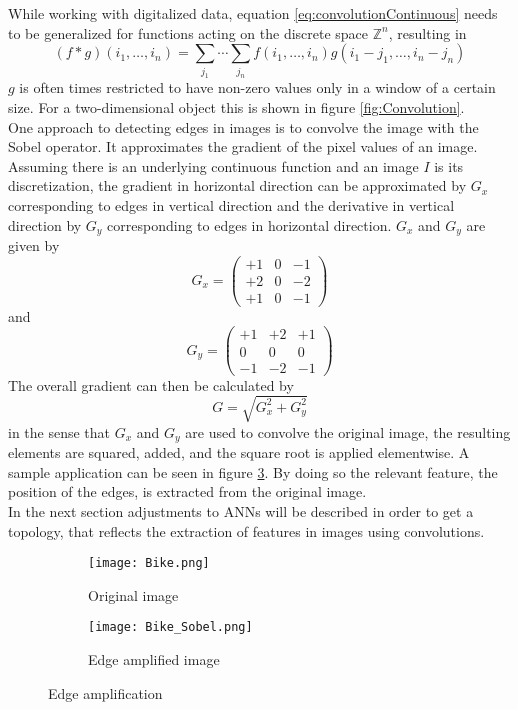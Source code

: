 While working with digitalized data, equation \ref{eq:convolutionContinuous} needs to be generalized for functions acting on the discrete space $\mathbb{Z}^n$, resulting in
\begin{equation}\label{eq:convolutionDiscrete}
(f*g)(i_1,\dots ,i_n) = \sum_{j_1} \cdots \sum_{j_n} f(i_1,\dots ,i_n) g(i_1-j_1,\dots ,i_n-j_n)
\end{equation}
$g$ is often times restricted to have non-zero values only in a window of a certain size. For a two-dimensional object this is shown in figure \ref{fig:Convolution}. \\
One approach to detecting edges in images is to convolve the image with the Sobel operator. It approximates the gradient of the pixel values of an image. Assuming there is an underlying continuous function and an image $I$ is its discretization, the gradient in horizontal direction can be approximated by $G_x$ corresponding to edges in vertical direction and the derivative in vertical direction by $G_y$ corresponding to edges in horizontal direction. $G_x$ and $G_y$ are given by
\begin{equation}
G_x =
\begin{pmatrix}
+1 & 0 & -1 \\
+2 & 0 & -2 \\
+1 & 0 & -1 
\end{pmatrix}
\end{equation}
and
\begin{equation}
G_y = 
\begin{pmatrix}
+1 & +2 & +1 \\
0 & 0 & 0 \\
-1 & -2 & -1
\end{pmatrix}
\end{equation}
The overall gradient can then be calculated by
\begin{equation}
G = \sqrt{G_x^2+G_y^2}
\end{equation}
in the sense that $G_x$ and $G_y$ are used to convolve the original image, the resulting elements are squared, added, and the square root is applied elementwise. A sample application can be seen in figure \ref{fig:Sobel}. By doing so the relevant feature, the position of the edges, is extracted from the original image. \\
In the next section adjustments to ANNs will be described in order to get a topology, that reflects the extraction of features in images using convolutions.
\begin{figure}
\centering
\begin{subfigure}{.5\textwidth}
  \centering
  \texttt{[image: Bike.png]}
  \caption{Original image}
  \label{fig:sub1}
\end{subfigure}%
\begin{subfigure}{.5\textwidth}
  \centering
  \texttt{[image: Bike\_Sobel.png]}
  \caption{Edge amplified image}
  \label{fig:sub2}
\end{subfigure}
\caption{Edge amplification}
\label{fig:Sobel}
\end{figure}


